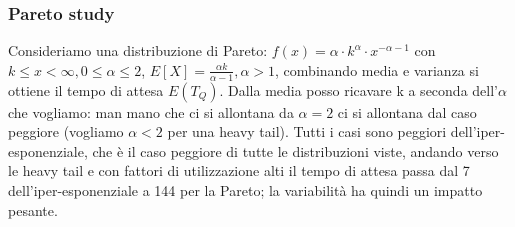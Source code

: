 \documentclass{article}
\begin{document}
\subsubsection{Pareto study}
Consideriamo una distribuzione di Pareto: $f(x) = \alpha \cdot k^{\alpha} \cdot x^{-\alpha-1}$ con $k \leq x < \infty, 0 \leq \alpha \leq 2$, $E[X] = \frac{\alpha k}{\alpha - 1}, \alpha > 1$, combinando media e varianza si ottiene il tempo di attesa $E(T_Q)$. Dalla media posso ricavare k a seconda dell'$\alpha$ che vogliamo: man mano che ci si allontana da $\alpha = 2$ ci si allontana dal caso peggiore (vogliamo $\alpha < 2$ per una heavy tail). Tutti i casi sono peggiori dell'iper-esponenziale, che è il caso peggiore di tutte le distribuzioni viste, andando verso le heavy tail e con fattori di utilizzazione alti il tempo di attesa passa dal 7 dell'iper-esponenziale a 144 per la Pareto; la variabilità ha quindi un impatto pesante.
\end{document}

